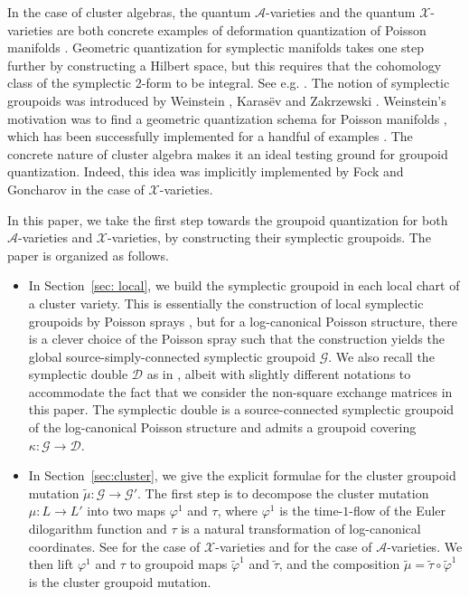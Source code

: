 \documentclass{amsart}
\numberwithin{equation}{section}
\newcommand{\cA}{\mathcal{A}}
\newcommand{\cG}{\mathcal{G}}
\renewcommand{\cD}{\mathcal{D}}
\newcommand{\cX}{\mathcal{X}}
\begin{document}
In the case of cluster algebras, the quantum $\cA$-varieties \cite{berenstein-zelevinsky} and the quantum $\cX$-varieties \cite{MR2470108} are both concrete examples of deformation quantization of Poisson manifolds \cite{MR2062626}. Geometric quantization for symplectic manifolds takes one step further by constructing a Hilbert space, but this requires that the cohomology class of the symplectic 2-form to be integral. See e.g. \cite{MR1806388}.
The notion of symplectic groupoids was introduced by Weinstein \cite{MR866024}, Karas\"{e}v \cite{MR1008479} and Zakrzewski \cite{MR1081010, MR1081011}. Weinstein's motivation was to find a geometric quantization schema for Poisson manifolds \cite{MR1104934}, which has been successfully implemented for a handful of examples \cite{MR2417440, MR2925830}. The concrete nature of cluster algebra makes it an ideal testing ground for groupoid quantization. Indeed, this idea was implicitly implemented by Fock and Goncharov \cite{MR2470108} in the case of $\cX$-varieties.

In this paper, we take the first step towards the groupoid quantization for both $\cA$-varieties and $\cX$-varieties, by constructing their symplectic groupoids. The paper is organized as follows.

\begin{itemize}
	\item In Section~\ref{sec: local}, we build the symplectic groupoid in each local chart of a cluster variety. This is essentially the construction of local symplectic groupoids by Poisson sprays \cite{MR2900786, CMS17}, but for a log-canonical Poisson structure, there is a clever choice of the Poisson spray such that the construction yields the global source-simply-connected symplectic groupoid $\cG$. We also recall the symplectic double $\cD$ as in \cite{MR2470108}, albeit with slightly different notations to accommodate the fact that we consider the non-square exchange matrices in this paper. The symplectic double is a source-connected symplectic groupoid of the log-canonical Poisson structure and admits a groupoid covering $\kappa: \cG \to \cD$.
	\item In Section~\ref{sec:cluster}, we give the explicit formulae for the cluster groupoid mutation $\tilde{\mu}: \cG \to \cG'$. The first step is to decompose the cluster mutation $\mu: L \to L'$ into two maps $\varphi^1$ and $\tau$, where $\varphi^1$ is the time-$1$-flow of the Euler dilogarithm function and $\tau$ is a natural transformation of log-canonical coordinates. See \cite{MR2567745} for the case of $\cX$-varieties and \cite{MR3691969} for the case of $\cA$-varieties. We then lift $\varphi^1$ and $\tau$ to groupoid maps $\tilde{\varphi}^1$ and $\tilde{\tau}$, and the composition $\tilde{\mu} = \tilde{\tau} \circ \tilde{\varphi}^1$ is the cluster groupoid mutation.
\end{itemize}
\end{document}
